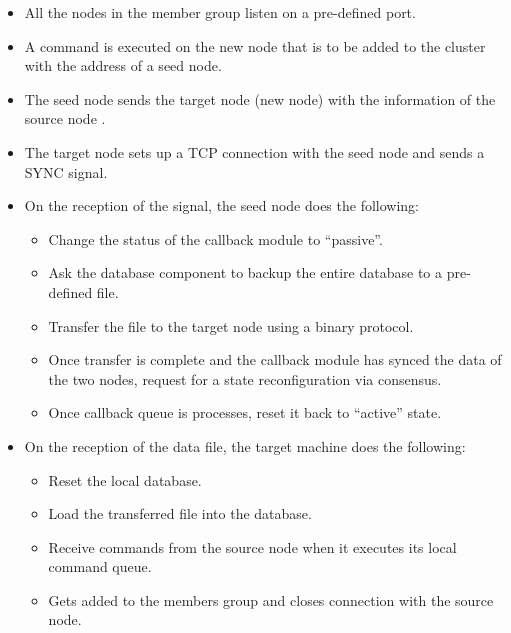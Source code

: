 \begin{itemize}
  \item All the nodes in the member group listen on a pre-defined port.
  \item A command is executed on the new node that is to be added to the cluster
    with the address of a seed%
     node.
  \item The seed node sends the target node (new node) with the information of 
    the source node%
    .
  \item The target node sets up a TCP connection with the seed node and sends
    a SYNC%
     signal.
  \item On the reception of the signal, the seed node does the following:
    \begin{itemize}
      \item Change the status of the callback module to ``passive''.
      \item Ask the database component to backup the entire database to a
        pre-defined file.
      \item Transfer the file to the target node using a binary protocol.
      \item Once transfer is complete and the callback module has synced
        the data of the two nodes, request for a state reconfiguration via
        consensus.
      \item Once callback queue is processes, reset it back to ``active'' state.
    \end{itemize}
  \item On the reception of the data file, the target machine does the 
    following:
    \begin{itemize}
      \item Reset the local database.
      \item Load the transferred file into the database.
      \item Receive commands from the source node when it executes its local
        command queue.
      \item Gets added to the members group and closes connection with the 
        source node.
    \end{itemize}
\end{itemize}

